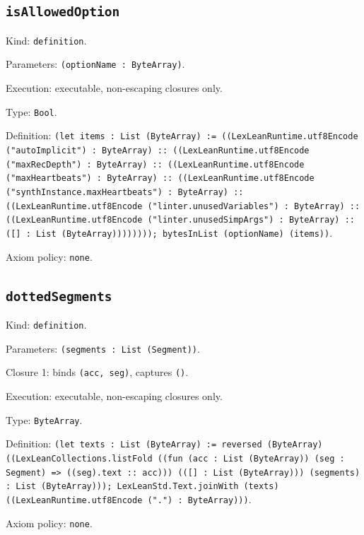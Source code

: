 \documentclass[11pt]{article}
\begin{document}
\subsection*{\texttt{isAllowedOption}}
\noindent Kind: \texttt{definition}.\par
\noindent Parameters: \texttt{(optionName : ByteArray)}.\par
\noindent Execution: executable, non-escaping closures only.\par
\noindent Type: \texttt{Bool}.\par
\noindent Definition: \texttt{(let items : List (ByteArray) := ((LexLeanRuntime.utf8Encode ("autoImplicit") : ByteArray) :: ((LexLeanRuntime.utf8Encode ("maxRecDepth") : ByteArray) :: ((LexLeanRuntime.utf8Encode ("maxHeartbeats") : ByteArray) :: ((LexLeanRuntime.utf8Encode ("synthInstance.maxHeartbeats") : ByteArray) :: ((LexLeanRuntime.utf8Encode ("linter.unusedVariables") : ByteArray) :: ((LexLeanRuntime.utf8Encode ("linter.unusedSimpArgs") : ByteArray) :: ([] : List (ByteArray)))))))); bytesInList (optionName) (items))}.\par
\noindent Axiom policy: \texttt{none}.\par
\subsection*{\texttt{dottedSegments}}
\noindent Kind: \texttt{definition}.\par
\noindent Parameters: \texttt{(segments : List (Segment))}.\par
\noindent Closure 1: binds \texttt{(acc, seg)}, captures \texttt{()}.\par
\noindent Execution: executable, non-escaping closures only.\par
\noindent Type: \texttt{ByteArray}.\par
\noindent Definition: \texttt{(let texts : List (ByteArray) := reversed (ByteArray) ((LexLeanCollections.listFold ((fun (acc : List (ByteArray)) (seg : Segment) => ((seg).text :: acc))) (([] : List (ByteArray))) (segments) : List (ByteArray))); LexLeanStd.Text.joinWith (texts) ((LexLeanRuntime.utf8Encode (".") : ByteArray)))}.\par
\noindent Axiom policy: \texttt{none}.\par
\end{document}
